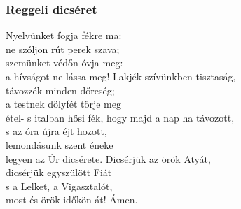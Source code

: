 \documentclass[twoside]{article}
\begin{document}

\subsubsection*{Reggeli dicséret}



\begin{hymnstanzas}
    Nyelvünket fogja fékre ma:\\
    ne szóljon rút perek szava;\\
    szemünket védőn óvja meg:\\
    a hívságot ne lássa meg!
\stanzabreak
    Lakjék szívünkben tisztaság,\\
    távozzék minden dőreség;\\
    a testnek dölyfét törje meg\\
    étel- s italban hősi fék,
\stanzabreak
    hogy majd a nap ha távozott,\\
    s az óra újra éjt hozott,\\
    lemondásunk szent éneke\\
    legyen az Úr dicsérete.
\stanzabreak
    Dicsérjük az örök Atyát,\\
    dicsérjük egyszülött Fiát\\
    s a Lelket, a Vigasztalót,\\
    most és örök időkön át! Ámen.\\
\end{hymnstanzas}



\end{document}
